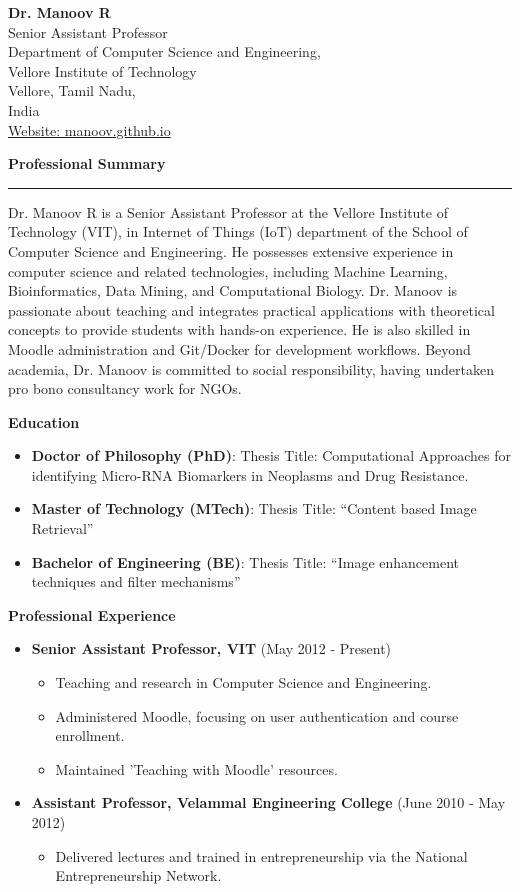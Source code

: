 \documentclass[a4paper,10pt]{article}
\newcommand{\sectiontitle}[1]{\vspace{1em}\textbf{\Large #1}\vspace{0.5em}\\\hrule\vspace{1em}}
\newcommand{\cvsection}[1]{%
    \vspace{2mm}
    \begin{tcolorbox}
        \textbf{\large #1}
    \end{tcolorbox}
    \vspace{-4mm}
}
\newcommand{\headerfontiii}{\fontfamily{ppl}\selectfont} %
\begin{document}
\headerfontiii
\begin{center}
    {\Large \textbf{Dr. Manoov R}}\\
    Senior Assistant Professor\\
    Department of Computer Science and Engineering,\\ Vellore Institute of Technology\\
    Vellore, Tamil Nadu, \\India \\
    \href{https://manoov.github.io}{Website: manoov.github.io}
\end{center}

\sectiontitle{Professional Summary}
Dr. Manoov R is a Senior Assistant Professor at the Vellore Institute of Technology (VIT), in Internet of Things (IoT) department of the School of Computer Science and Engineering. He possesses extensive experience in computer science and related technologies, including Machine Learning, Bioinformatics, Data Mining, and Computational Biology. Dr. Manoov is passionate about teaching and integrates practical applications with theoretical concepts to provide students with hands-on experience. He is also skilled in Moodle administration and Git/Docker for development workflows. Beyond academia, Dr. Manoov is committed to social responsibility, having undertaken pro bono consultancy work for NGOs.

\cvsection{Education}
\begin{itemize}[leftmargin=*]
    \item \textbf{Doctor of Philosophy (PhD)}: Thesis Title: Computational Approaches for identifying Micro-RNA Biomarkers in Neoplasms and Drug Resistance.
    \item \textbf{Master of Technology (MTech)}: Thesis Title: “Content based Image Retrieval”
    \item \textbf{Bachelor of Engineering (BE)}: Thesis Title: “Image enhancement techniques and filter mechanisms”
\end{itemize}

\cvsection{Professional Experience}
\begin{itemize}[leftmargin=*]
    \item \textbf{Senior Assistant Professor, VIT} (May 2012 - Present)
        \begin{itemize}[leftmargin=*]
            \item Teaching and research in Computer Science and Engineering.
            \item Administered Moodle, focusing on user authentication and course enrollment.
            \item Maintained 'Teaching with Moodle' resources.
        \end{itemize}
    \item \textbf{Assistant Professor, Velammal Engineering College} (June 2010 - May 2012)
        \begin{itemize}[leftmargin=*]
            \item Delivered lectures and trained in entrepreneurship via the National Entrepreneurship Network.
        \end{itemize}
\end{itemize}
\end{document}
